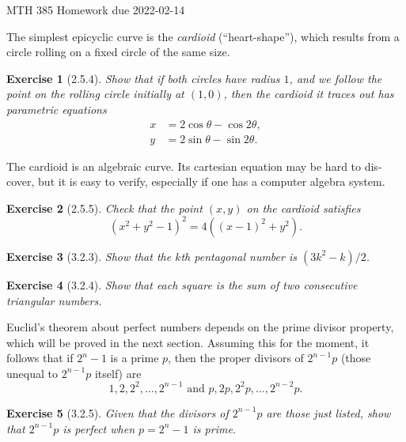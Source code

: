 \documentclass[12pt]{article}
\theoremstyle{plain}
\newtheorem{ex}{Exercise}
\begin{document}
MTH 385 \qquad Homework due 2022-02-14

The simplest epicyclic curve is the \emph{cardioid} (``heart-shape''), which results from a circle rolling on a fixed circle of the same size.

\begin{ex} [2.5.4]
  Show that if both circles have radius $1$, and we follow the point on the rolling circle initially at $(1,0)$, then the cardioid it traces out has parametric equations
  \begin{align*}
    x &= 2\cos\theta-\cos2\theta, \\
    y &= 2\sin\theta-\sin2\theta.
  \end{align*}
\end{ex}

The cardioid is an algebraic curve. Its cartesian equation may be hard to dis- cover, but it is easy to verify, especially if one has a computer algebra system.

\begin{ex} [2.5.5]
  Check that the point $(x,y)$ on the cardioid satisfies
  \[
    (x^2+y^2-1)^2=4((x-1)^2+y^2).
  \]
\end{ex}

\begin{ex} [3.2.3]
  Show that the $k$th pentagonal number is $(3k^2-k)/2$.
\end{ex}

\begin{ex} [3.2.4]
  Show that each square is the sum of two consecutive triangular numbers.
\end{ex}

Euclid's theorem about perfect numbers depends on the prime divisor property, which will be proved in the next section. Assuming this for the moment, it follows that if $2^n-1$ is a prime $p$, then the proper divisors of $2^{n-1}p$ (those unequal to $2^{n-1}p$ itself) are
\[
  1,2,2^2,\ldots,2^{n-1}\text{ and }p,2p,2^2p,\ldots,2^{n-2}p.
\]

\begin{ex} [3.2.5]
  Given that the divisors of $2^{n-1}p$ are those just listed, show that $2^{n-1}p$ is perfect when $p=2^n-1$ is prime.
\end{ex}
\end{document}
